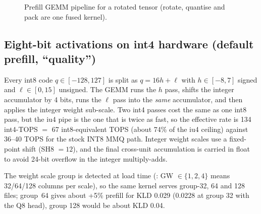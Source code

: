 \documentclass[10pt,a4paper]{article}
\newcommand{\tx}[1]{\texttt{\detokenize{#1}}}
\newcommand{\X}{\mathbf{x}}
\newcommand{\HD}{\mathbf{R}}
\begin{document}
\begin{figure}[H]
\centering
{}
\caption{Prefill GEMM pipeline for a rotated tensor (rotate, quantise and pack are one fused kernel).}
\end{figure}

\subsection{Eight-bit activations on int4 hardware (default prefill, ``quality'')}
Every int8 code $q\in[-128,127]$ is split as $q=16h+\ell$ with $h\in[-8,7]$ signed and $\ell\in[0,15]$ unsigned. The GEMM
runs the $h$ pass, shifts the integer accumulator by 4 bits, runs the $\ell$ pass into the \emph{same} accumulator, and then
applies the integer weight sub-scale. Two int4 passes cost the same as one int8 pass, but the iu4 pipe is the one that is twice
as fast, so the effective rate is 134 int4-TOPS $=$ 67 int8-equivalent TOPS (about 74\% of the iu4 ceiling) against 36--40 TOPS
for the stock INT8 MMQ path. Integer weight scales use a fixed-point shift (SH8 $=12$), and the final cross-unit accumulation is
carried in float to avoid 24-bit overflow in the integer multiply-adds.

The weight scale group is detected at load time (\tx{k_detect_gw}: GW $\in\{1,2,4\}$ means 32/64/128 columns per scale), so
the same kernel serves group-32, 64 and 128 files; group~64 gives about +5\% prefill for KLD 0.029 (0.0228 at group 32 with
the Q8 head), group 128 would be about KLD 0.04.
\end{document}
